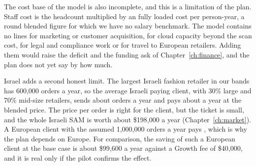 The cost base of the model is also incomplete, and this is a limitation of the plan. Staff cost is the headcount multiplied by an  fully loaded cost per person-year, a round blended figure for which we have no salary benchmark. The model contains no lines for marketing or customer acquisition, for cloud capacity beyond the scan cost, for legal and compliance work or for travel to European retailers. Adding them would raise the deficit and the funding ask of Chapter~\ref{ch:finance}, and the plan does not yet say by how much.

Israel adds a second honest limit. The largest Israeli fashion retailer in our bands has 600,000 orders a year, so the average Israeli paying client, with 30\% large and 70\% mid-size retailers, sends about  orders a year and pays about  a year at the blended price. The price per order is right for the client, but the ticket is small, and the whole Israeli SAM is worth about \$198,000 a year (Chapter~\ref{ch:market}). A European client with the assumed 1,000,000 orders a year pays , which is why the plan depends on Europe. For comparison, the saving of such a European client at the base case is about \$99,600 a year against a Growth fee of \$40,000, and it is real only if the pilot confirms the effect.

\ctchapterend
